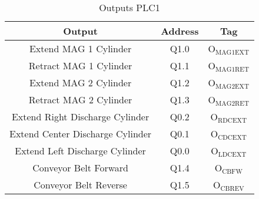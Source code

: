 \begin{table}[htbp]
\caption{Outputs PLC1}
\centering
\begin{tabular}{c|c|c}
Output & Address & Tag\\
\hline
Extend MAG 1 Cylinder & Q1.0 & O\(_{\text{MAG1EXT}}\)\\
Retract MAG 1 Cylinder & Q1.1 & O\(_{\text{MAG1RET}}\)\\
Extend MAG 2 Cylinder & Q1.2 & O\(_{\text{MAG2EXT}}\)\\
Retract MAG 2 Cylinder & Q1.3 & O\(_{\text{MAG2RET}}\)\\
Extend Right Discharge Cylinder & Q0.2 & O\(_{\text{RDCEXT}}\)\\
Extend Center Discharge Cylinder & Q0.1 & O\(_{\text{CDCEXT}}\)\\
Extend Left Discharge Cylinder & Q0.0 & O\(_{\text{LDCEXT}}\)\\
Conveyor Belt Forward & Q1.4 & O\(_{\text{CBFW}}\)\\
Conveyor Belt Reverse & Q1.5 & O\(_{\text{CBREV}}\)\\
\end{tabular}
\end{table}

